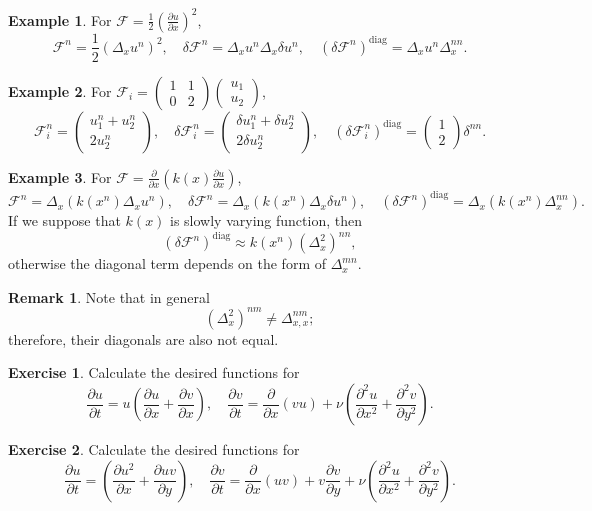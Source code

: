 \documentclass{article}
\newcommand{\pert}[1]{\delta#1}
\newcommand{\pder}[2][]{\frac{\partial#1}{\partial#2}}      %
\newcommand{\dder}[1]{\Delta_{#1}}                          %
\newcommand{\pderdual}[2][]{\frac{\partial^2#1}{\partial#2^2}}
\newcommand{\FF}{\mathcal{F}}
\newcommand{\diag}[1]{\left(#1\right)^\mathrm{diag}}
\newcommand{\matr}[4]{\begin{pmatrix} #1 & #2\\#3 & #4\end{pmatrix}}
\newcommand{\vect}[2]{\begin{pmatrix} #1\\#2\end{pmatrix}}
\theoremstyle{definition}
\newtheorem{example}{Example}
\newtheorem{remark}{Remark}
\newtheorem{exercise}{Exercise}
\begin{document}
\begin{example}
    For \(\FF = \frac12\left(\pder[u]{x}\right)^2\), \[
        \FF^n = \frac12\left(\dder{x}u^n\right)^2, \quad
        \pert{\FF^n} = \dder{x}u^n\dder{x}\pert{u^n}, \quad
        \diag{\pert{\FF^n}} = \dder{x}u^n\dder{x}^{nn}.
    \]
\end{example}
\begin{example}
    For \(\FF_i = \matr1102\vect{u_1}{u_2}\), \[
        \FF_i^n = \vect{u_1^n+u_2^n}{2u_2^n}, \quad
        \pert{\FF_i^n} = \vect{\pert{u_1^n}+\pert{u_2^n}}{2\pert{u_2^n}}, \quad
        \diag{\pert{\FF_i^n}} = \vect{1}{2}\delta^{nn}.
    \]
\end{example}
\begin{example}
    For \(\FF = \pder{x}\left( k(x)\pder[u]{x} \right)\), \[
        \FF^n = \dder{x}\left(k(x^n)\dder{x}u^n\right), \quad
        \pert{\FF^n} = \dder{x}\left(k(x^n)\dder{x}\pert{u^n}\right), \quad
        \diag{\pert{\FF^n}} = \dder{x}(k(x^n)\dder{x}^{nn}).
    \]
    If we suppose that \(k(x)\) is slowly varying function, then \[
        \diag{\pert{\FF^n}} \approx k(x^n)(\dder{x}^2)^{nn},
    \]
    otherwise the diagonal term depends on the form of \(\dder{x}^{mn}\).
\end{example}
\begin{remark}
    Note that in general \[
        (\dder{x}^2)^{nm} \neq \dder{x,x}^{nm};
    \]
    therefore, their diagonals are also not equal.
\end{remark}

\begin{exercise}
    Calculate the desired functions for \[
        \pder[u]{t} = u\left(\pder[u]{x} + \pder[v]{x}\right), \quad
        \pder[v]{t} = \pder{x}(vu) + \nu\left(\pderdual[u]{x}+\pderdual[v]{y}\right).
    \]
\end{exercise}
\begin{exercise}
    Calculate the desired functions for \[
        \pder[u]{t} = \left(\pder[u^2]{x} + \pder[uv]{y}\right), \quad
        \pder[v]{t} = \pder{x}(uv) + v \pder[v]{y} + \nu\left(\pderdual[u]{x}+\pderdual[v]{y}\right).
    \]
\end{exercise}
\end{document}
